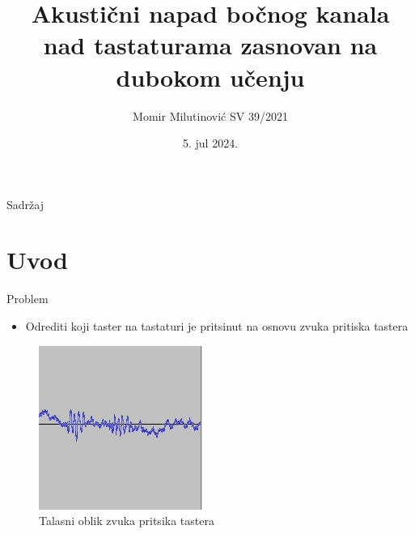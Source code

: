 \documentclass{beamer}
\title{Akustični napad bočnog kanala nad tastaturama zasnovan na dubokom učenju}
\author{Momir Milutinović SV 39/2021}
\date{5. jul 2024.}
\begin{document}
\maketitle

\begin{frame}{Sadržaj}
\tableofcontents
\end{frame}

\section{Uvod}
\begin{frame}{Problem}
    \begin{itemize}
        \item Odrediti koji taster na tastaturi je pritsinut na osnovu zvuka pritiska tastera 
    \end{itemize}
    \begin{figure}
        \centering
        \includegraphics[scale=0.7]{KeystrokeSoundAudacity.jpg}
        \centering
        \captionsetup{justification=centering}
        \caption{Talasni oblik zvuka pritsika tastera}
        \label{fig:my_label}
    \end{figure}
\end{frame}
\end{document}
